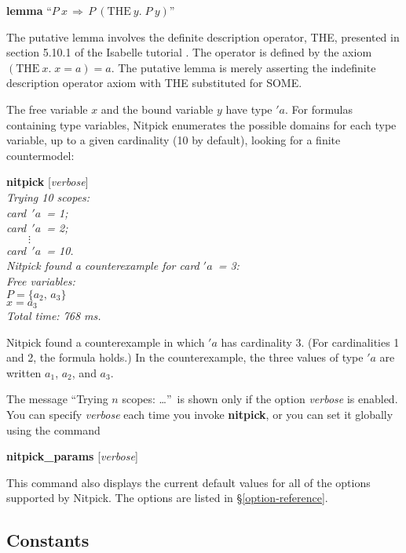 \documentclass[a4paper,12pt]{article}
\begin{document}
\prew
\textbf{lemma} ``$P~x\,\Longrightarrow\, P~(\textrm{THE}~y.\;P~y)$''
\postw
\pagebreak[2] %

The putative lemma involves the definite description operator, {THE}, presented
in section 5.10.1 of the Isabelle tutorial \cite{isa-tutorial}. The
operator is defined by the axiom $(\textrm{THE}~x.\; x = a) = a$. The putative
lemma is merely asserting the indefinite description operator axiom with {THE}
substituted for {SOME}.

The free variable $x$ and the bound variable $y$ have type $'a$. For formulas
containing type variables, Nitpick enumerates the possible domains for each type
variable, up to a given cardinality (10 by default), looking for a finite
countermodel:

\prew
\textbf{nitpick} [\textit{verbose}] \\[2\smallskipamount]
\slshape
Trying 10 scopes: \nopagebreak \\
\hbox{}\qquad \textit{card}~$'a$~= 1; \\
\hbox{}\qquad \textit{card}~$'a$~= 2; \\
\hbox{}\qquad $\qquad\vdots$ \\[.5\smallskipamount]
\hbox{}\qquad \textit{card}~$'a$~= 10. \\[2\smallskipamount]
Nitpick found a counterexample for \textit{card} $'a$~= 3: \\[2\smallskipamount]
\hbox{}\qquad Free variables: \nopagebreak \\
\hbox{}\qquad\qquad $P = \{a_2,\, a_3\}$ \\
\hbox{}\qquad\qquad $x = a_3$ \\[2\smallskipamount]
Total time: 768 ms.
\postw

Nitpick found a counterexample in which $'a$ has cardinality 3. (For
cardinalities 1 and 2, the formula holds.) In the counterexample, the three
values of type $'a$ are written $a_1$, $a_2$, and $a_3$.

The message ``Trying $n$ scopes: {\ldots}''\ is shown only if the option
\textit{verbose} is enabled. You can specify \textit{verbose} each time you
invoke \textbf{nitpick}, or you can set it globally using the command

\prew
\textbf{nitpick\_params} [\textit{verbose}]
\postw

This command also displays the current default values for all of the options
supported by Nitpick. The options are listed in \S\ref{option-reference}.

\subsection{Constants}
\label{constants}
\end{document}
